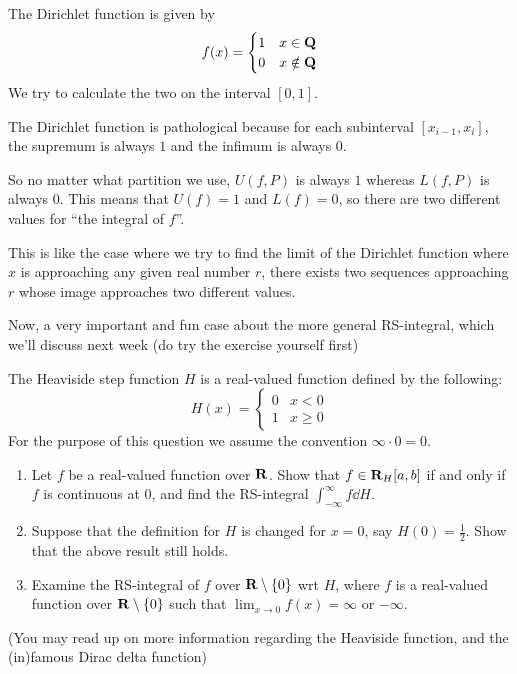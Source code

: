 
\begin{example}
The Dirichlet function is given by
\[ f(x)=\begin{cases}
1 & x\in\mathbf Q \\
0 & x\notin\mathbf Q
\end{cases} \]
We try to calculate the two on the interval $[0,1]$.

The Dirichlet function is pathological because for each subinterval $[x_{i-1},x_i]$, the supremum is always $1$ and the infimum is always $0$.

So no matter what partition we use, $U(f,P)$ is always $1$ whereas $L(f,P)$ is always $0$. This means that $U(f)=1$ and $L(f)=0$, so there are two different values for ``the integral of $f$''.

This is like the case where we try to find the limit of the Dirichlet function where $x$ is approaching any given real number $r$, there exists two sequences approaching $r$ whose image approaches two different values.
\end{example}

Now, a very important and fun case about the more general RS-integral, which we'll discuss next week (do try the exercise yourself first)

\begin{exercise}
The Heaviside step function $H$ is a real-valued function defined by the following:
\[ H(x)=\begin{cases}
0 & x<0 \\
1 & x\ge0
\end{cases} \]
For the purpose of this question we assume the convention $\infty\cdot0=0$.
\begin{enumerate}[label=(\alph*)]
\item Let $f$ be a real-valued function over $\mathbf R$. Show that $f\in\mathbf R_H [a,b]$ if and only if $f$ is continuous at $0$, and find the RS-integral $\int_{-\infty}^\infty f\dd{H}$.
\item Suppose that the definition for $H$ is changed for $x=0$, say $H(0)=\frac{1}{2}$. Show that the above result still holds.
\item Examine the RS-integral of $f$ over $\mathbf R\setminus\{0\}$ wrt $H$, where $f$ is a real-valued function over $\mathbf R\setminus\{0\}$ such that $\lim_{x\to0}f(x)=\infty$ or $-\infty$.
\end{enumerate}
(You may read up on more information regarding the Heaviside function, and the (in)famous Dirac delta function)
\end{exercise}




